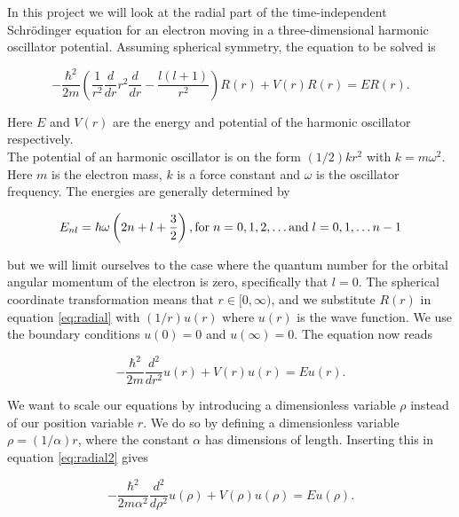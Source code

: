 \documentclass[12pt]{article}
\numberwithin{figure}{section}
\numberwithin{table}{section}
\begin{document}
\noindent In this project we will look at the radial part of the time-independent Schrödinger equation for an electron moving in a three-dimensional harmonic oscillator potential. Assuming spherical symmetry, the equation to be solved is \cite{pro2} 

\begin{equation}
\label{eq:radial}
  -\frac{\hbar^2}{2 m} \left ( \frac{1}{r^2} \frac{d}{dr} r^2
  \frac{d}{dr} - \frac{l (l + 1)}{r^2} \right )R(r) 
     + V(r) R(r) = E R(r).
\end{equation}



\noindent Here $E$ and $V(r)$ are the energy and potential of the harmonic oscillator respectively.\\ The potential of an harmonic oscillator is on the form $(1/2)kr^2$ with $k=m\omega^2$. Here $m$ is the electron mass, $k$ is a force constant and $\omega$ is the oscillator frequency. The energies are generally determined by \cite{pro2}

\begin{equation}
E_{nl}=  \hbar \omega \left(2n+l+\frac{3}{2}\right), \textrm{for} \hspace{0.1cm} n=0,1,2,\dots \textrm{and}  \hspace{0.1cm} l=0,1,\dots n-1
\end{equation}

\noindent but we will limit ourselves to the case where the quantum number for the orbital angular momentum of the electron is zero, specifically that $l=0$. The spherical coordinate transformation means that $r\in [0,\infty)$, and we substitute $R(r)$ in equation \eqref{eq:radial} with  $(1/r) u(r)$ where $u(r)$ is the wave function. We use the boundary conditions $u(0)=0$ and $u(\infty)=0$. The equation now reads \cite{pro2}

\begin{equation}
\label{eq:radial2}
  -\frac{\hbar^2}{2 m} \frac{d^2}{dr^2} u(r) 
       + V(r) u(r)  = E u(r) .
\end{equation}


\noindent We want to scale our equations by introducing a dimensionless variable $\rho $ instead of our position variable $r$. We do so by defining a dimensionless variable $\rho = (1/\alpha) r$, where the constant $\alpha$ has dimensions of length. Inserting this in equation \eqref{eq:radial2} gives \cite{pro2}


\begin{equation}
\label{eq:radial3}
  -\frac{\hbar^2}{2 m \alpha^2} \frac{d^2}{d\rho^2} u(\rho) 
       + V(\rho) u(\rho)  = E u(\rho) .
\end{equation}
\end{document}
